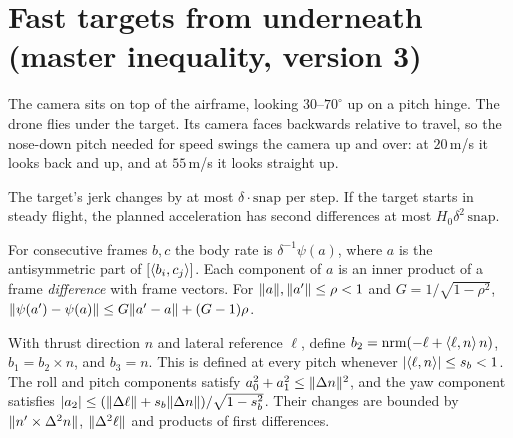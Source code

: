 \chapter{Fast targets from underneath (master inequality, version 3)}
\label{chap:under}

The camera sits on top of the airframe, looking $30$--$70^\circ$ up on a pitch hinge. The
drone flies under the target. Its camera faces backwards relative to travel, so the
nose-down pitch needed for speed swings the camera up and over: at $20$\,m/s it looks back
and up, and at $55$\,m/s it looks straight up.

\begin{lemma}
\label{lem:snap}
\leanok
{}
The target's jerk changes by at most $\delta\cdot\mathrm{snap}$ per step. If the target
starts in steady flight, the planned acceleration has second differences at most
$H_0\delta^2\,\mathrm{snap}$.
\end{lemma}

\begin{theorem}
\label{thm:body-rate}
\leanok
{}
For consecutive frames $b,c$ the body rate is $\delta^{-1}\psi(a)$, where $a$ is the
antisymmetric part of $[\langle b_i, c_j \rangle]$. Each component of $a$ is an inner product of a
frame \emph{difference} with frame vectors. For $\lVert a \rVert,\lVert a' \rVert\le\rho<1$ and
$G=1/\sqrt{1-\rho^2}$, $\lVert \psi(a')-\psi(a) \rVert\le G\lVert a'-a \rVert+(G-1)\rho$.
\end{theorem}

\begin{theorem}
\label{thm:lateral}
\leanok
{}
With thrust direction $n$ and lateral reference $\ell$, define
$b_2=\mathrm{nrm}(-\ell+\langle \ell, n \rangle\,n)$, $b_1=b_2\times n$, and $b_3=n$. This is defined at
every pitch whenever $\lvert\langle \ell, n \rangle\rvert\le s_b<1$. The roll and pitch components satisfy
$a_0^2+a_1^2\le\lVert \Delta n \rVert^2$, and the yaw component satisfies
$\lvert a_2\rvert\le(\lVert \Delta\ell \rVert+s_b\lVert \Delta n \rVert)/\sqrt{1-s_b^2}$. Their changes are
bounded by $\lVert n'\times\Delta^2n \rVert$, $\lVert \Delta^2\ell \rVert$ and products of first
differences.
\end{theorem}

